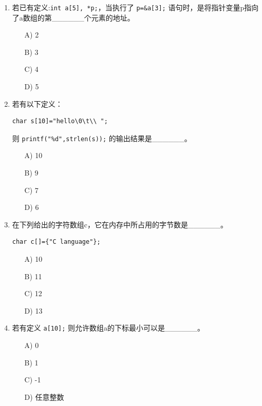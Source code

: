 \documentclass[a4paper,12pt]{article}
\begin{document}
\begin{enumerate}
	\item 若已有定义:\texttt{int a[5], *p;}，当执行了 \texttt{p=\&a[3];} 语句时，是将指针变量p指向了a数组的第\_\_\_\_\_\_个元素的地址。
	      \begin{enumerate}
		      \item[A)] 2
		      \item[B)] 3
		      \item[C)] 4
		      \item[D)] 5
	      \end{enumerate}
	      \vspace{0.3cm}

	\item 若有以下定义：
	      \begin{verbatim}
char s[10]="hello\0\t\\ ";
      \end{verbatim}
	      则 \texttt{printf("\%d",strlen(s));} 的输出结果是\_\_\_\_\_\_。
	      \begin{enumerate}
		      \item[A)] 10
		      \item[B)] 9
		      \item[C)] 7
		      \item[D)] 6
	      \end{enumerate}
	      \vspace{0.3cm}

	\item 在下列给出的字符数组c，它在内存中所占用的字节数是\_\_\_\_\_\_。
	      \begin{verbatim}
char c[]={"C language"};
    \end{verbatim}
	      \begin{enumerate}
		      \item[A)] 10
		      \item[B)] 11
		      \item[C)] 12
		      \item[D)] 13
	      \end{enumerate}
	      \vspace{0.3cm}

	\item 若有定义 \texttt{a[10];} 则允许数组a的下标最小可以是\_\_\_\_\_\_。
	      \begin{enumerate}
		      \item[A)] 0
		      \item[B)] 1
		      \item[C)] -1
		      \item[D)] 任意整数
	      \end{enumerate}
	      \vspace{0.3cm}


\end{enumerate}
\end{document}
